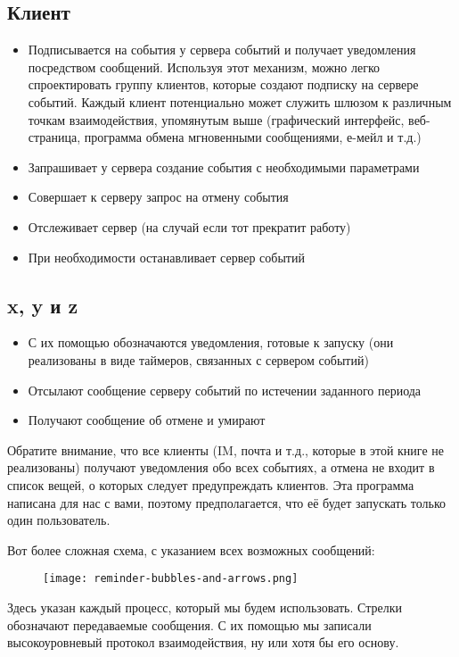 \subsection{Клиент}
\begin{itemize}
\item Подписывается на события у сервера событий и получает уведомления посредством сообщений.
Используя этот механизм, можно легко спроектировать группу клиентов, которые создают подписку на сервере событий.
Каждый клиент потенциально может служить шлюзом к различным точкам взаимодействия, упомянутым выше (графический интерфейс, веб\--страница, программа обмена мгновенными сообщениями, е\--мейл и т.д.)
\item Запрашивает у сервера создание события с необходимыми параметрами
\item Совершает к серверу запрос на отмену события
\item Отслеживает сервер (на случай если тот прекратит работу)
\item При необходимости останавливает сервер событий
\end{itemize}
\subsection{x, y и z}
\begin{itemize}
\item С их помощью обозначаются уведомления, готовые к запуску (они реализованы в виде таймеров, связанных с сервером событий)
\item Отсылают сообщение серверу событий по истечении заданного периода
\item Получают сообщение об отмене и умирают
\end{itemize}

Обратите внимание, что все клиенты (IM, почта и т.д., которые в этой книге не реализованы) получают уведомления обо всех событиях, а отмена не входит в список вещей, о которых следует предупреждать клиентов.
Эта программа написана для нас с вами, поэтому предполагается, что её будет запускать только один пользователь.

Вот более сложная схема, с указанием всех возможных сообщений:
\begin{figure}[h!]
    \centering
    \texttt{[image: reminder-bubbles-and-arrows.png]}
\end{figure}

Здесь указан каждый процесс, который мы будем использовать.
Стрелки обозначают передаваемые сообщения.
С их помощью мы записали высокоуровневый протокол взаимодействия, ну или хотя бы его основу.

